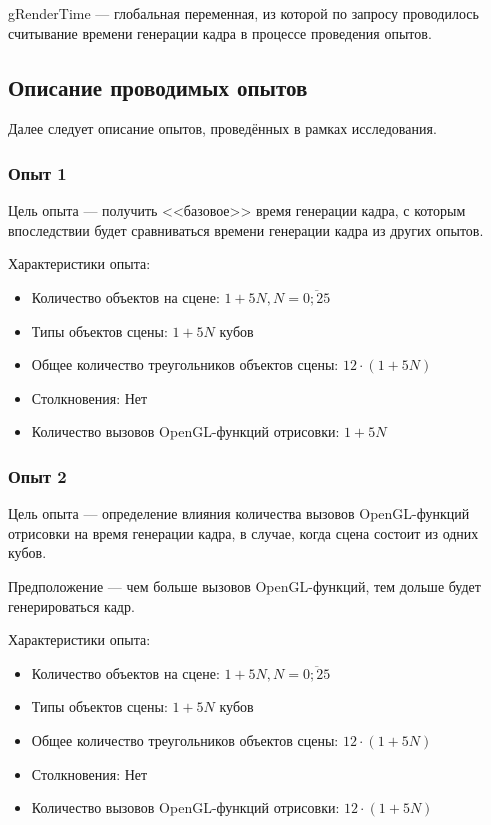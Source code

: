 gRenderTime --- глобальная переменная, из которой по запросу проводилось считывание времени генерации кадра в процессе проведения опытов.

\subsection{Описание проводимых опытов}

Далее следует описание опытов, проведённых в рамках исследования.

\subsubsection{Опыт 1}

Цель опыта --- получить <<базовое>> время генерации кадра, с которым впоследствии будет сравниваться времени генерации кадра из других опытов.

Характеристики опыта:
\begin{itemize}
    \item Количество объектов на сцене: $1 + 5 N, N = \overline{0; 25}$
    \item Типы объектов сцены: $1 + 5 N$ кубов
    \item Общее количество треугольников объектов сцены: $12 \cdot (1 + 5 N)$
    \item Столкновения: Нет
    \item Количество вызовов OpenGL-функций отрисовки: $1 + 5 N$
\end{itemize}

\subsubsection{Опыт 2}

Цель опыта --- определение влияния количества вызовов OpenGL-функций отрисовки на время генерации кадра, в случае, когда сцена состоит из одних кубов.

Предположение --- чем больше вызовов OpenGL-функций, тем дольше будет генерироваться кадр.

Характеристики опыта:
\begin{itemize}
    \item Количество объектов на сцене: $1 + 5 N, N = \overline{0; 25}$
    \item Типы объектов сцены: $1 + 5 N$ кубов
    \item Общее количество треугольников объектов сцены: $12 \cdot (1 + 5 N)$
    \item Столкновения: Нет
    \item Количество вызовов OpenGL-функций отрисовки: $12 \cdot (1 + 5 N)$
\end{itemize}

